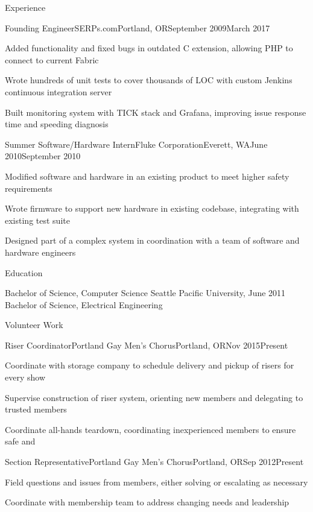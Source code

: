 \documentclass[letterpaper,10pt]{article}
\begin{document}
\begin{res_section}{Experience}
\begin{res_experienceitem}{Founding Engineer}{SERPs.com}{Portland, OR}{September 2009}{March 2017}
  \item Added functionality and fixed bugs in outdated C extension, allowing PHP to connect to current Fabric
  \item Wrote hundreds of unit tests to cover thousands of LOC with custom Jenkins continuous integration server
  \item Built monitoring system with TICK stack and Grafana, improving issue response time and speeding diagnosis
\end{res_experienceitem}
\begin{res_experienceitem}{Summer Software/Hardware Intern}{Fluke Corporation}{Everett, WA}{June 2010}{September 2010}
  \item Modified software and hardware in an existing product to meet higher safety requirements
  \item Wrote firmware to support new hardware in existing codebase, integrating with existing test suite
  \item Designed part of a complex system in coordination with a team of software and hardware engineers
\end{res_experienceitem}
\end{res_section}

\begin{res_section}{Education}
\begin{res_content}{Bachelor of Science, Computer Science
  \textnormal{
      \sffamily
      \normalsize
      \hfill
      Seattle Pacific University, June 2011}\\
  Bachelor of Science, Electrical Engineering
}
\end{res_content}
\end{res_section}

\begin{res_section}{Volunteer Work}
  \begin{res_experienceitem}{Riser Coordinator}{Portland Gay Men's Chorus}{Portland, OR}{Nov 2015}{Present}
    \item Coordinate with storage company to schedule delivery and pickup of risers for every show
    \item Supervise construction of riser system, orienting new members and delegating to trusted members
    \item Coordinate all-hands teardown, coordinating inexperienced members to ensure safe and 
  \end{res_experienceitem}
  \begin{res_experienceitem}{Section Representative}{Portland Gay Men's Chorus}{Portland, OR}{Sep 2012}{Present}
    \item Field questions and issues from members, either solving or escalating as necessary
    \item Coordinate with membership team to address changing needs and leadership
  \end{res_experienceitem}
\end{res_section}
\end{document}
